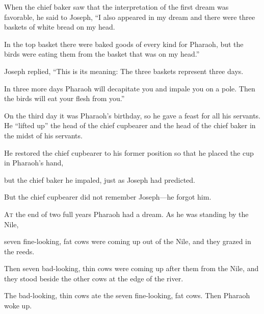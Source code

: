 \begin{scripture}
 When the chief baker saw that the interpretation of the first dream was favorable, he said to Joseph, ``I also appeared in my dream and there were three baskets of white bread on my head.
 In the top basket there were baked goods of every kind for Pharaoh, but the birds were eating them from the basket that was on my head.''
\everypar{}

 Joseph replied, ``This is its meaning: The three baskets represent three days.
 In three more days Pharaoh will decapitate you and impale you on a pole. Then the birds will eat your flesh from you.''
\everypar{}

 On the third day it was Pharaoh's birthday, so he gave a feast for all his servants. He ``lifted up'' the head of the chief cupbearer and the head of the chief baker in the midst of his servants.
 He restored the chief cupbearer to his former position so that he placed the cup in Pharaoh's hand,
 but the chief baker he impaled, just as Joseph had predicted.
 But the chief cupbearer did not remember Joseph---he forgot him.

 \allowchapbreak\hypertarget{ch-genesis-41}{}\lettrine[lines=5]{\color{pentateuch}A}{\textsc{t}} the end of two full years Pharaoh had a dream. As he was standing by the Nile,\everypar{}
 seven fine-looking, fat cows were coming up out of the Nile, and they grazed in the reeds.
 Then seven bad-looking, thin cows were coming up after them from the Nile, and they stood beside the other cows at the edge of the river.
 The bad-looking, thin cows ate the seven fine-looking, fat cows. Then Pharaoh woke up.
\everypar{}


\end{scripture}
